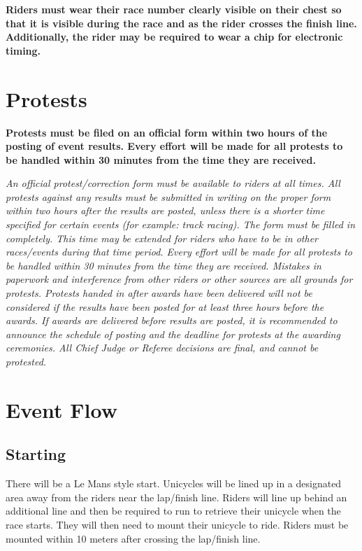 \textbf{Riders must wear their race number clearly visible on their chest so that it is visible during the race and as the rider crosses the finish line.  Additionally, the rider may be required to wear a chip for electronic timing.}

\section{Protests}

\textbf{Protests must be filed on an official form within two hours of the posting of event results. Every effort will be made for all protests to be handled within 30 minutes from the time they are received.}

\textit{An official protest/correction form must be available to riders at all times. All
protests against any results must be submitted in writing on the proper form within
two hours after the results are posted, unless there is a shorter time specified for certain
events (for example: track racing). The form must be filled in completely. This time
may be extended for riders who have to be in other races/events during that time period.
Every effort will be made for all protests to be handled within 30 minutes from the time
they are received. Mistakes in paperwork and interference from other riders or other
sources are all grounds for protests. Protests handed in after awards have been delivered
will not be considered if the results have been posted for at least three hours before the
awards. If awards are delivered before results are posted, it is recommended to announce
the schedule of posting and the deadline for protests at the awarding ceremonies. All
Chief Judge or Referee decisions are final, and cannot be protested.}

\section{Event Flow}

\subsection{Starting}

There will be a Le Mans style start.
Unicycles will be lined up in a designated area away from the riders near the lap/finish line.
Riders will line up behind an additional line and then be required to run to retrieve their unicycle when the race starts.
They will then need to mount their unicycle to ride.
Riders must be mounted within 10 meters after crossing the lap/finish line.

